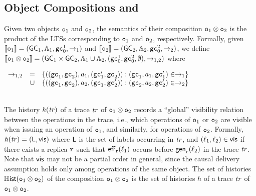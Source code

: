 \subsection{Object Compositions and \CRDTLin{}}\label{ssec:comp_intro}

Given two objects $\mathtt{o}_1$ and $\mathtt{o}_2$, the semantics of their composition $\mathtt{o}_1\otimes \mathtt{o}_2$ is the product of the LTSs corresponding to $\mathtt{o}_1$ and $\mathtt{o}_2$, respectively. Formally, given $\llbracket \mathtt{o}_1 \rrbracket =(\mathsf{GC}_1,\mathbb{A}_1,\mathtt{gc}_0^1,\rightarrow_1)$ and $\llbracket \mathtt{o}_2 \rrbracket =(\mathsf{GC}_2,\mathbb{A}_2,\mathtt{gc}_0^2,\rightarrow_2)$, we define $\llbracket \mathtt{o}_1\otimes \mathtt{o}_2 \rrbracket =(\mathsf{GC}_1\times \mathsf{GC}_2,\mathbb{A}_1\cup \mathbb{A}_2,(\mathtt{gc}_0^1,\mathtt{gc}_0^2,\emptyset),\rightarrow_{1,2})$ where\\[2pt]
\centerline{
\(
\begin{array}{rcl}
  \rightarrow_{1,2} & = & \{ ((\mathtt{gc}_1,\mathtt{gc}_2),a_1,(\mathtt{gc}_1',\mathtt{gc}_2)): (\mathtt{gc}_1,a_1,\mathtt{gc}_1')\in\rightarrow_1\}\\
                    & \cup & \{ ((\mathtt{gc}_1,\mathtt{gc}_2),a_2,(\mathtt{gc}_1,\mathtt{gc}_2')): (\mathtt{gc}_2,a_2,\mathtt{gc}_2')\in\rightarrow_2\}
\end{array}
\)
}\\[2pt]
 The history $\mathit{h}({\mathit{tr})}$ of a trace $\mathit{tr}$ of $\mathtt{o}_1\otimes \mathtt{o}_2$ records a ``global'' visibility relation between the operations in the trace, i.e., which operations of $\mathtt{o}_1$ or $\mathtt{o}_2$ are visible when issuing an operation of $\mathtt{o}_1$, and similarly, for operations of $\mathtt{o}_2$. Formally, $\mathit{h}({\mathit{tr})}=(\mathsf{L}, \mathsf{vis})$ where $\mathsf{L}$ is the set of labels occurring in $\mathit{tr}$, and $(\ell_1,\ell_2)\in\mathsf{vis}$ if there exists a replica $\mathtt{r}$ such that $\mathsf{eff}_{\mathtt{r}}(\ell_1)$ occurs before $\mathsf{gen}_{\mathtt{r}}(\ell_2)$ in the trace $\mathit{tr}$. Note that $\mathsf{vis}$ may not be a partial order in general, since the causal delivery assumption holds only among operations of the same object. The set of histories $\mathbb{H}\mathsf{ist}(\mathtt{o}_1\otimes \mathtt{o}_2)$ of the composition $\mathtt{o}_1\otimes \mathtt{o}_2$ is the set of histories $h$ of a trace $\mathit{tr}$ of $\mathtt{o}_1\otimes \mathtt{o}_2$.

